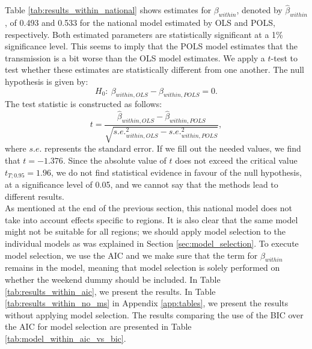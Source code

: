 \documentclass[12pt]{article}
\begin{document}
	Table \ref{tab:results_within_national} shows estimates for $\beta_{within}$, denoted by $\hat{\beta}_{within}$, of 0.493 and 0.533 for the national model estimated by OLS and POLS, respectively. Both estimated parameters are statistically significant at a 1\% significance level. This seems to imply that the POLS model estimates that the transmission is a bit worse than the OLS model estimates. We apply a $t$-test to test whether these estimates are statistically different from one another. The null hypothesis is given by:
	    \[H_0:~ \beta_{within, OLS} - \beta_{within,POLS} = 0.\]
	The test statistic is constructed as follows:
	    \[t = \frac{\hat{\beta}_{within, OLS} - \hat{\beta}_{within, POLS}}{\sqrt{s.e.^2_{within, OLS} - s.e.^2_{within, POLS}}},\]
	where $s.e.$ represents the standard error. If we fill out the needed values, we find that $t = -1.376$. Since the absolute value of $t$ does not exceed the critical value $t_{T; 0.95} = 1.96$, we do not find statistical evidence in favour of the null hypothesis, at a significance level of 0.05, and we cannot say that the methods lead to different results. \\
	
	As mentioned at the end of the previous section, this national model does not take into account effects specific to regions. It is also clear that the same model might not be suitable for all regions; we should apply model selection to the individual models as was explained in Section \ref{sec:model_selection}. To execute model selection, we use the AIC and we make sure that the term for $\beta_{within}$ remains in the model, meaning that model selection is solely performed on whether the weekend dummy should be included. In Table \ref{tab:results_within_aic}, we present the results. In Table \ref{tab:results_within_no_ms} in Appendix \ref{app:tables}, we present the results without applying model selection. The results comparing the use of the BIC over the AIC for model selection are presented in Table \ref{tab:model_within_aic_vs_bic}.
	
	\setlength{\LTleft}{-20cm plus -1fill}
    \setlength{\LTright}{\LTleft}
	
\end{document}
